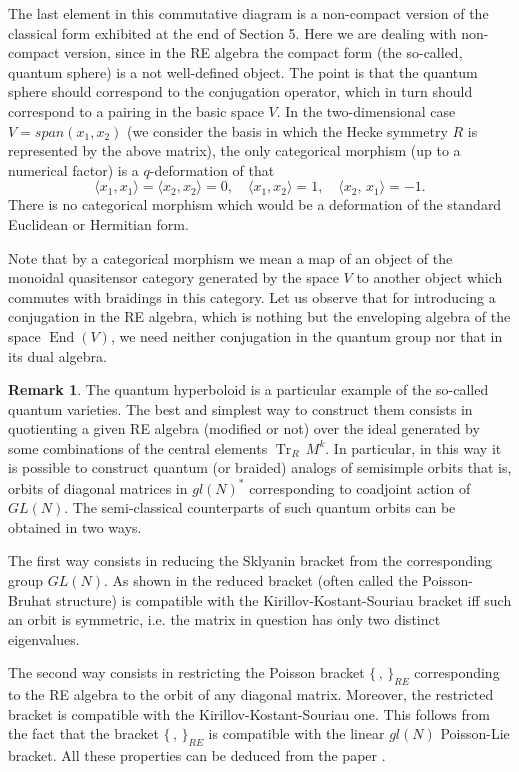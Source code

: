 \documentclass[11pt]{article}
\DeclareMathOperator{\Tr}{Tr}
\DeclareMathOperator{\End}{End}
\numberwithin{equation}{section}
\theoremstyle{plain}
\theoremstyle{definition}
\newtheorem{remark}[theorem]{Remark}
\begin{document}
The last element in this commutative diagram is a non-compact version of the classical form exhibited at the end of Section 5.
Here we are dealing with non-compact version, since in the RE algebra the compact form (the so-called, quantum sphere) is a
not well-defined object. The point is that the quantum sphere should correspond to the conjugation operator, which  in turn
should correspond to a pairing in the basic space $V$. In the two-dimensional case $V=span(x_1,x_2)$ (we consider the basis
in which  the Hecke symmetry $R$ is represented by the above matrix), the only categorical morphism (up to a numerical factor)
is a $q$-deformation of that
\[
\langle x_1,x_1 \rangle =\langle x_2,x_2 \rangle=0,\quad \langle x_1, x_2  \rangle=1,\quad \langle x_2,\, x_1  \rangle=-1.
\]
There is no categorical morphism which would be a deformation of the standard Euclidean or Hermitian form.

Note that by a categorical  morphism  we mean a map of an object of the monoidal quasitensor category generated by
the space $V$ to another object  which commutes with braidings in this category. Let us observe that for introducing
a conjugation in the RE algebra, which is nothing but the enveloping algebra of the space $\End(V)$, we need neither
conjugation in the quantum group nor that in its dual algebra.

\begin{remark}
The quantum hyperboloid is a particular example of the so-called quantum varieties. The best and simplest way to
	construct them consists in quotienting a given  RE algebra (modified or not) over the ideal generated by some
	combinations  of the central elements  $\Tr_R\, M^k$. In particular, in this way it is possible to construct quantum
	(or braided) analogs of semisimple orbits that is, orbits of diagonal matrices in $gl(N)^*$ corresponding to coadjoint
	action of $GL(N)$. The semi-classical counterparts of such quantum orbits can be obtained in two ways.
	
	The first way consists in reducing the Sklyanin bracket from the corresponding group $GL(N)$.  As shown in \cite{KRR}
	the reduced bracket (often called the Poisson-Bruhat structure) is compatible with the Kirillov-Kostant-Souriau bracket
	iff such an orbit is symmetric, i.e. the matrix in question has only two distinct eigenvalues.
	
	The second way consists in restricting the Poisson bracket $\{\,,\,\}_{RE}$
	corresponding to the RE algebra to the orbit of any diagonal matrix. Moreover, the restricted bracket is compatible with
	the Kirillov-Kostant-Souriau one. This follows from the fact that the  bracket $\{\,,\,\}_{RE}$  is compatible with the linear $gl(N)$
	Poisson-Lie bracket. All these properties can be deduced from the paper \cite{Don}.
	\end{remark}
\end{document}
